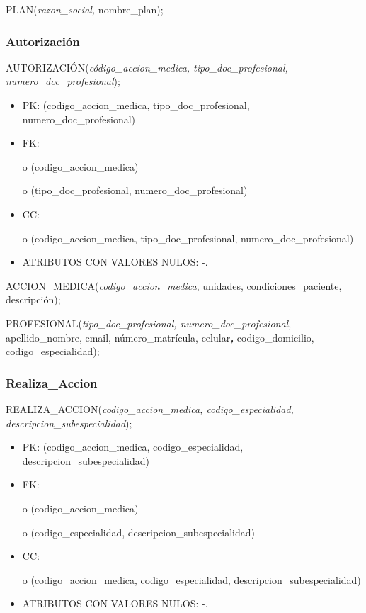 \documentclass[a4paper,11pt]{article}
\begin{document}
PLAN(\emph{razon\_social, }nombre\_plan);\label{HToc293405847}

\subsubsection{\textbf{Autorización}}

AUTORIZACIÓN(\emph{código\_accion\_medica, tipo\_doc\_profesional, numero\_doc\_profesional});

\begin{itemize}
\item PK: (codigo\_accion\_medica, tipo\_doc\_profesional, numero\_doc\_profesional)

\item FK: 

o (codigo\_accion\_medica)

o (tipo\_doc\_profesional, numero\_doc\_profesional)

\item CC:

o (codigo\_accion\_medica, tipo\_doc\_profesional, numero\_doc\_profesional)

\item ATRIBUTOS CON VALORES NULOS:  -.
\end{itemize}

ACCION\_MEDICA(\emph{codigo\_accion\_medica}, unidades, condiciones\_paciente, 
descripción);

PROFESIONAL(\emph{tipo\_doc\_profesional, numero\_doc\_profesional}, apellido\_nombre, 
email, número\_matrícula, celular\textit{\textbf{, }}codigo\_domicilio, codigo\_especialidad);\label{HToc293405848}

\subsubsection{\textbf{Realiza\_Accion}}

REALIZA\_ACCION(\emph{codigo\_accion\_medica, codigo\_especialidad, descripcion\_subespecialidad});

\begin{itemize}
\item PK: (codigo\_accion\_medica, codigo\_especialidad, descripcion\_subespecialidad)

\item FK: 

o (codigo\_accion\_medica)

o (codigo\_especialidad, descripcion\_subespecialidad)

\item CC:

o (codigo\_accion\_medica, codigo\_especialidad, descripcion\_subespecialidad)

\item ATRIBUTOS CON VALORES NULOS:  -.
\end{itemize}
\end{document}

